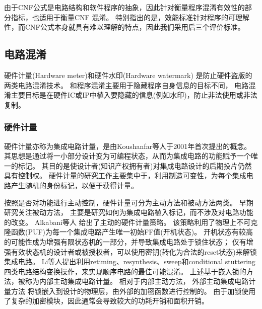 由于CNF公式是电路结构和软件程序的抽象，因此针对衡量程序混淆有效性的部分指标，也适用于衡量CNF 混淆。
特别指出的是，效能标准针对程序的可理解性，而CNF公式本身就具有难以理解的特点，因此我们采用后三个评价标准。

\subsection{电路混淆}
硬件计量(Hardware meter)和硬件水印(Hardware watermark) 是防止硬件盗版的两类电路混淆技术。
和程序混淆主要用于隐藏程序自身信息的目标不同，
电路混淆主要目标是在硬件IC或IP中植入要隐藏的信息(例如水印)，防止非法使用或非法复制。

\subsubsection{硬件计量}
硬件计量亦称为集成电路计量，是由Koushanfar等人于2001年首次提出的概念。
其思想是通过将一小部分设计变为可编程状态，从而为集成电路的功能赋予一个唯一的标记。
其目的是使设计者(知识产权拥有者)对集成电路设计的后期投片仍然具有控制权。
硬件计量的研究工作主要集中于，利用制造可变性，为每个集成电路产生随机的身份标记，以便于获得计量。

按照是否对功能进行主动控制，硬件计量可分为主动方法和被动方法两类。
早期研究关注被动方法，
主要是研究如何为集成电路植入标记，而不涉及对电路功能的改变。
Alkabani等人 给出了主动的硬件计量策略。
该策略利用了物理上不可克隆函数(PUF)为每一个集成电路产生唯一初始FF值(开机状态)。
开机状态有较高的可能性成为增强有限状态机的一部分，并导致集成电路处于锁住状态；
仅有增强有效状态机的设计者或被授权者，可以使用密钥(转化为合法的reset状态)来解锁集成电路。
Li等人提出利用retiming、resynthesis、sweep和conditional stuttering
四类电路结构变换操作，来实现顺序电路的最佳可能混淆。
上述基于嵌入锁的方法，被称为内部主动集成电路计量。
相对于内部主动方法，
外部主动集成电路计量方法
将锁嵌入到设计的物理层，由外部的加密函数进行控制的。
由于加锁使用了复杂的加密模块，因此通常会导致较大的功耗开销和面积开销。


